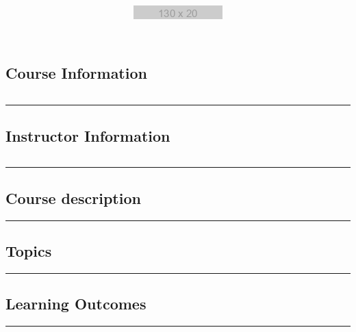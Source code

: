 \documentclass[11pt]{handout}
\title{\includegraphics[scale=1.0]{assets/logo.png}}
\begin{document}
\maketitle


\subsection*{Course Information}
\vspace{0ex}%
\noindent\parbox{0.5\textwidth}{%
\noindent\begin{tabular}{@{}ll}

\end{tabular}}
\vspace{2ex}\hrule\vspace{2ex}


\subsection*{Instructor Information}
\noindent\parbox{0.5\textwidth}{%
\noindent\begin{tabular}{@{}ll}

\end{tabular}}
\vspace{2ex}\hrule\vspace{2ex}

 
\subsection*{Course description} 

\vspace{2ex} \hrule\vspace{2ex}
 
 
\subsection*{Topics} 

\vspace{2ex} \hrule\vspace{2ex}
 

\subsection*{Learning Outcomes}

\vspace{2ex}\hrule\vspace{2ex}
\end{document}
